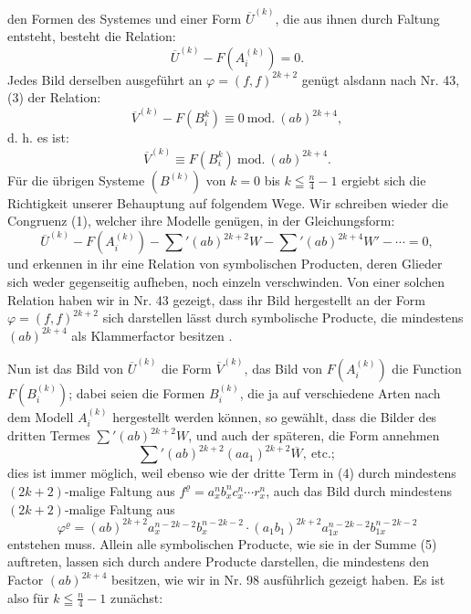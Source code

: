 \documentclass[11pt]{article}
\providecommand{\weberpage}[1]{}
\providecommand{\weq}[2]{\begin{equation}\tag{#1}#2\end{equation}}
\begin{document}
\weberpage{234}
den Formen des Systemes und einer Form $\overline{U}^{(k)}$, die aus ihnen durch
Faltung entsteht, besteht die Relation:
\[
\overline{U}^{(k)} - F(A_i^{(k)}) = 0.
\]
Jedes Bild derselben ausgeführt an $\varphi = (f,f)^{2k+2}$ genügt alsdann
nach Nr. 43, (3) der Relation:
\[
\overline{V}^{(k)} - F(B_i^{k}) \equiv 0 \ \mathrm{mod.}\ (ab)^{2k+4},
\]
d. h. es ist:
\[
\overline{V}^{(k)} \equiv F(B_i^{k}) \ \mathrm{mod.}\ (ab)^{2k+4}.
\]
Für die übrigen Systeme $(B^{(k)})$ von $k = 0$ bis $k \leqq \frac{n}{4} - 1$ ergiebt
 sich die Richtigkeit unserer Behauptung auf folgendem Wege.
Wir schreiben wieder die Congruenz (1), welcher ihre Modelle genügen,
in der Gleichungsform:
\weq{4}{\overline{U}^{(k)} - F(A_i^{(k)}) - \sum{}'(ab)^{2k+2} W - \sum{}'(ab)^{2k+4} W' - \cdots = 0,}
und erkennen in ihr eine Relation von symbolischen Producten, deren
Glieder sich weder gegenseitig aufheben, noch einzeln verschwinden.
Von einer solchen Relation haben wir in Nr. 43 gezeigt, dass ihr
Bild hergestellt an der Form $\varphi = (f,f)^{2k+2}$ sich darstellen lässt durch
symbolische Producte, die mindestens $(ab)^{2k+4}$ als Klammerfactor besitzen
.

Nun ist das Bild von $\overline{U}^{(k)}$ die Form $\overline{V}^{(k)}$, das Bild von $F(A_i^{(k)})$
die Function $F(B_i^{(k)})$; dabei seien die Formen $B_i^{(k)}$, die ja auf verschiedene
 Arten nach dem Modell $A_i^{(k)}$ hergestellt werden können, so
gewählt, dass die Bilder des dritten Termes $\sum{}'(ab)^{2k+2} W$, und auch
der späteren, die Form annehmen
\weq{5}{\sum{}'(ab)^{2k+2}(aa_1)^{2k+2}\overline{W},\ \text{etc.};}
dies ist immer möglich, weil ebenso wie der dritte Term in (4) durch
mindestens $(2k+2)$-malige Faltung aus $f^\varrho = a_x^n b_x^n c_x^n \cdots r_x^n$, auch das
Bild durch mindestens $(2k+2)$-malige Faltung aus
\[
\varphi^\varrho = (ab)^{2k+2} a_x^{n-2k-2} b_x^{n-2k-2} \cdot (a_1 b_1)^{2k+2} a_{1x}^{n-2k-2} b_{1x}^{n-2k-2}
\]
entstehen muss. Allein alle symbolischen Producte, wie sie in der
Summe (5) auftreten, lassen sich durch andere Producte darstellen,
die mindestens den Factor $(ab)^{2k+4}$ besitzen, wie wir in Nr. 98 ausführlich
 gezeigt haben. Es ist also für $k \leqq \frac{n}{4} - 1$ zunächst:
\end{document}
